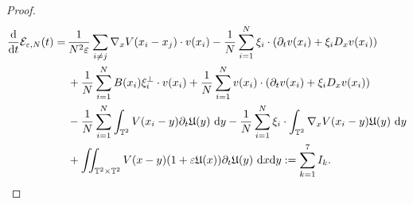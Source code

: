 \documentclass[11pt,reqno]{amsart}
\numberwithin{equation}{section}
\def\dd{{\rm d}}
\begin{document}
\begin{proof}
\begin{align}
\frac{\dd}{\dd t}\mathcal{E}_{\varepsilon,N}(t)
=&\,\frac{1}{N^{2}\varepsilon}\sum_{i\neq j}\nabla_{x} V(x_{i}-x_{j})\cdot v(x_{i})
-\frac{1}{N}\sum_{i=1}^{N}\xi_{i}\cdot(\partial_{t}v(x_{i})+\xi_{i}D_{x}v(x_{i})) \notag\\
&\,+\frac{1}{N}\sum_{i=1}^{N}B(x_{i})\xi_{i}^{\perp}\cdot v(x_{i})+\frac{1}{N}\sum_{i=1}^{N}v(x_{i})\cdot\left(\partial_{t}v(x_{i})+\xi_{i}D_{x}v(x_{i})\right) \notag\\
&\,-\frac{1}{N}\sum_{i=1}^
{N}\int_{\mathbb{T}^{2}} V(x_{i}-y)\partial_{t}\mathfrak{U}(y)\ \dd y-\frac{1}{N}\sum_{i=1}^{N}\xi_{i}\cdot \int_{\mathbb{T}^{2}} \nabla_{x} V(x_{i}-y)\mathfrak{U}(y)\ \dd y \notag\\
&\,+\iint_{\mathbb{T}^{2}\times \mathbb{T}^{2}} V(x-y)(1+\varepsilon\mathfrak{U}(x))\partial_{t}\mathfrak{U}(y)\ \dd x\dd y:= \sum_{k=1}^{7}I_{k}. 
\end{align}


\end{proof}
\end{document}
